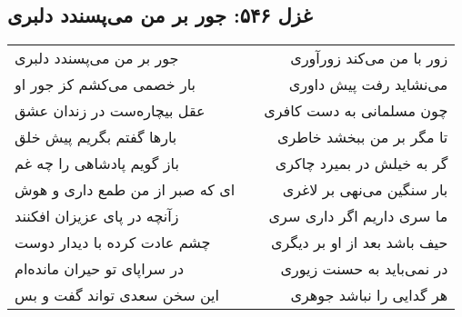 \begin{center}
\section*{غزل ۵۴۶: جور بر من می‌پسندد دلبری}
\label{sec:546}
\begin{longtable}{l p{0.5cm} r}
جور بر من می‌پسندد دلبری
&&
زور با من می‌کند زورآوری
\\
بار خصمی می‌کشم کز جور او
&&
می‌نشاید رفت پیش داوری
\\
عقل بیچاره‌ست در زندان عشق
&&
چون مسلمانی به دست کافری
\\
بارها گفتم بگریم پیش خلق
&&
تا مگر بر من ببخشد خاطری
\\
باز گویم پادشاهی را چه غم
&&
گر به خیلش در بمیرد چاکری
\\
ای که صبر از من طمع داری و هوش
&&
بار سنگین می‌نهی بر لاغری
\\
زآنچه در پای عزیزان افکنند
&&
ما سری داریم اگر داری سری
\\
چشم عادت کرده با دیدار دوست
&&
حیف باشد بعد از او بر دیگری
\\
در سراپای تو حیران مانده‌ام
&&
در نمی‌باید به حسنت زیوری
\\
این سخن سعدی تواند گفت و بس
&&
هر گدایی را نباشد جوهری
\\
\end{longtable}
\end{center}
